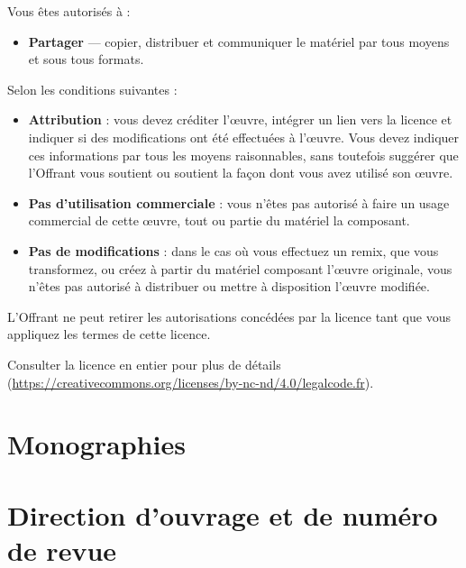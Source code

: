 \documentclass{article}
\begin{document}
\bigskip

    Vous êtes autorisés à :
    \begin{itemize}
        \item \textbf{Partager} --- copier, distribuer et communiquer le matériel par tous moyens et sous tous formats.
    \end{itemize}

\bigskip

    Selon les conditions suivantes :
    \begin{itemize}
        \item \textbf{Attribution} : vous devez créditer l'\oe{}uvre, intégrer un lien vers la licence et indiquer si des modifications ont été effectuées à l'\oe{}uvre. Vous devez indiquer ces informations par tous les moyens raisonnables, sans toutefois suggérer que l'Offrant vous soutient ou soutient la façon dont vous avez utilisé son \oe{}uvre.
        \item \textbf{Pas d'utilisation commerciale} : vous n'êtes pas autorisé à faire un usage commercial de cette \oe{}uvre, tout ou partie du matériel la composant. 
        \item \textbf{Pas de modifications} : dans le cas où vous effectuez un remix, que vous transformez, ou créez à partir du matériel composant l'\oe{}uvre originale, vous n'êtes pas autorisé à distribuer ou mettre à disposition l'\oe{}uvre modifiée. 
    \end{itemize}

\medskip

L'Offrant ne peut retirer les autorisations concédées par la licence tant que vous appliquez les termes de cette licence.

\medskip

    Consulter la licence en entier pour plus de détails (\url{https://creativecommons.org/licenses/by-nc-nd/4.0/legalcode.fr}). 

\newpage
\thispagestyle{empty}
\tableofcontents

\nocite{*}
\newpage

\section{Monographies}

\printbibliography[heading=subbibliography,keyword=monographie2017,heading=none]

\section{Direction d'ouvrage et de numéro de revue}
\end{document}
